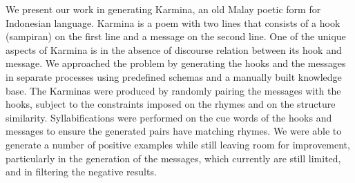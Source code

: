We present our work in generating Karmina, an old Malay poetic form for Indonesian language. Karmina is a poem with two lines that consists of a hook
 (sampiran) on the first line and a message on the second line. One of the
 unique aspects of Karmina is in the absence of discourse relation between its
 hook and message. We approached the problem by generating the hooks and the
 messages in separate processes using predefined schemas and a manually built
 knowledge base. The Karminas were produced by randomly pairing the messages
 with the hooks, subject to the constraints imposed on the rhymes and on the
 structure similarity. Syllabifications were performed on the cue words of the
 hooks and messages to ensure the generated pairs have matching rhymes. We were
 able to generate a number of positive examples while still leaving room for
 improvement, particularly in the generation of the messages, which currently
 are still limited, and in filtering the negative results.

